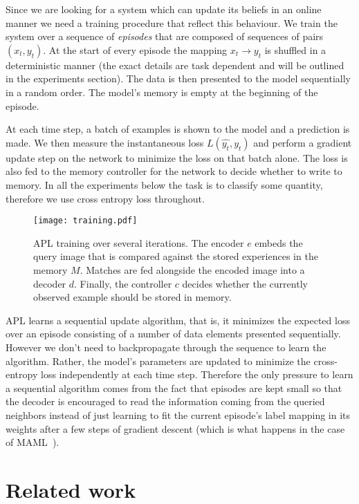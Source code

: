 \documentclass{article} \usepackage{iclr2019_conference,times}
\begin{document}
Since we are looking for a system which can update its beliefs in an online manner we need a training procedure that reflect this behaviour. We train the system over a sequence of \textit{episodes} that are composed of sequences of pairs $(x_t, y_t)$. At the start of every episode the mapping $x_t \rightarrow y_t$ is shuffled in a deterministic manner (the exact details are task dependent and will be outlined in the experiments section). The data is then presented to the model sequentially in a random order. The model's memory is empty at the beginning of the episode.

At each time step, a batch of examples is shown to the model and a prediction is made. We then measure the instantaneous loss $L(\hat{y_t}, y_t)$ and perform a gradient update step on the network to minimize the loss on that batch alone. The loss is also fed to the memory controller for the network to decide whether to write to memory. In all the experiments below the task is to classify some quantity, therefore we use cross entropy loss throughout. 

\begin{figure}[ht]
\begin{center}
\texttt{[image: training.pdf]}
\end{center}
\caption{APL training over several iterations. The encoder $e$ embeds the query image that is compared against the stored experiences in the memory $M$. Matches are fed alongside the encoded image into a decoder $d$. Finally, the controller $c$ decides whether the currently observed example should be stored in memory.}
\end{figure}

APL learns a sequential update algorithm, that is, it minimizes the expected loss over an episode consisting of a number of data elements presented sequentially. However we don't need to backpropagate through the sequence to learn the algorithm. Rather, the model's parameters are updated to minimize the cross-entropy loss independently at each time step. Therefore the only pressure to learn a sequential algorithm comes from the fact that episodes are kept small so that the decoder is encouraged to read the information coming from the queried neighbors instead of just learning to fit the current episode's label mapping in its weights after a few steps of gradient descent (which is what happens in the case of MAML~\citep{finn2017model}).



\section{Related work}
\end{document}
